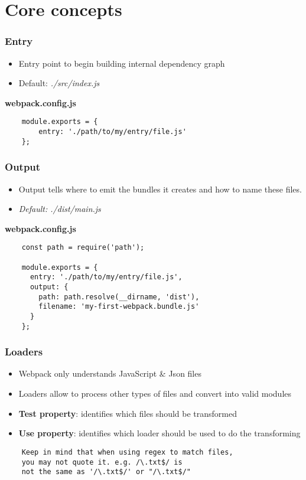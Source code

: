 \section{Core concepts}

\frame{\tableofcontents[currentsection]}

\begin{frame}[fragile]
    \frametitle{Entry}
    \begin{itemize}
        \item Entry point to begin building internal dependency graph
        \item Default: \textit{./src/index.js}
    \end{itemize}
    \vfill
    \textbf{webpack.config.js}
    \begin{verbatim}
    module.exports = {
        entry: './path/to/my/entry/file.js'
    };
    \end{verbatim}
\end{frame}

\begin{frame}[fragile]
    \frametitle{Output}
    \begin{itemize}
        \item Output tells where to emit the bundles it creates and how to name these files.
        \item \textit{Default: ./dist/main.js}
    \end{itemize}
    \vfill
    \textbf{webpack.config.js}
    \begin{verbatim}
    const path = require('path');
    
    module.exports = {
      entry: './path/to/my/entry/file.js',
      output: {
        path: path.resolve(__dirname, 'dist'),
        filename: 'my-first-webpack.bundle.js'
      }
    };
    \end{verbatim}
\end{frame}

\begin{frame}[fragile]
    \frametitle{Loaders}
    \begin{itemize}
        \item Webpack only understands JavaScript \& Json files
        \item Loaders allow to process other types of files and convert into valid modules
        \item \textbf{Test property}: identifies which files should be transformed
        \item \textbf{Use property}: identifies which loader should be used to do the transforming
    \end{itemize}
    \vfill
    \begin{verbatim}
    Keep in mind that when using regex to match files,
    you may not quote it. e.g. /\.txt$/ is 
    not the same as '/\.txt$/' or "/\.txt$/"
    \end{verbatim}
\end{frame}


